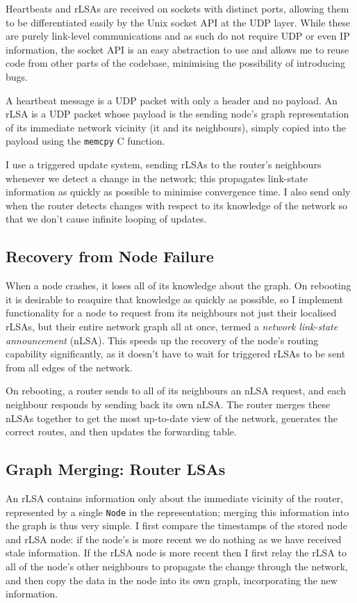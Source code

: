 \documentclass[withindex,glossary,openany]{cam-thesis}
\begin{document}
Heartbeats and rLSAs are received on sockets with distinct ports, allowing them to be differentiated easily by the Unix socket API at the UDP layer. While these are purely link-level communications and as such do not require UDP or even IP information, the socket API is an easy abstraction to use and allows me to reuse code from other parts of the codebase, minimising the possibility of introducing bugs.

A heartbeat message is a UDP packet with only a header and no payload. An rLSA is a UDP packet whose payload is the sending node's graph representation of its immediate network vicinity (it and its neighbours), simply copied into the payload using the \texttt{memcpy} C function.

I use a triggered update system, sending rLSAs to the router's neighbours whenever we detect a change in the network;  this propagates link-state information as quickly as possible to minimise convergence time. I also send only when the router detects changes with respect to its knowledge of the network so that we don't cause infinite looping of updates.

\subsection{Recovery from Node Failure}
\label{subsec:node_failure}

When a node crashes, it loses all of its knowledge about the graph. On rebooting it is desirable to reaquire that knowledge as quickly as possible, so I implement functionality for a node to request from its neighbours not just their localised rLSAs, but their entire network graph all at once, termed a \textit{network link-state announcement} (nLSA). This speeds up the recovery of the node's routing capability significantly, as it doesn't have to wait for triggered rLSAs to be sent from all edges of the network.

On rebooting, a router sends to all of its neighbours an nLSA request, and each neighbour responds by sending back its own nLSA. The router merges these nLSAs together to get the most up-to-date view of the network, generates the correct routes, and then updates the forwarding table.

\subsection{Graph Merging: Router LSAs}
\label{subsec:merge_rlsa}

An rLSA contains information only about the immediate vicinity of the router, represented by a single \texttt{Node} in the representation; merging this information into the graph is thus very simple. I first compare the timestamps of the stored node and rLSA node: if the node's is more recent we do nothing as we have received stale information. If the rLSA node is more recent then I first relay the rLSA to all of the node's other neighbours to propagate the change through the network, and then copy the data in the node into its own graph, incorporating the new information.
\end{document}
